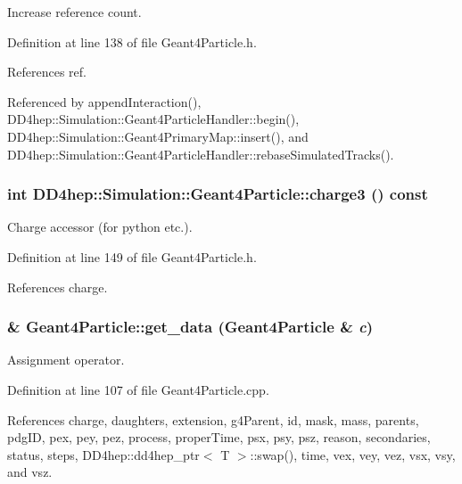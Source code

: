 Increase reference count. 

Definition at line 138 of file Geant4Particle.h.

References ref.

Referenced by appendInteraction(), DD4hep::Simulation::Geant4ParticleHandler::begin(), DD4hep::Simulation::Geant4PrimaryMap::insert(), and DD4hep::Simulation::Geant4ParticleHandler::rebaseSimulatedTracks().\hypertarget{class_d_d4hep_1_1_simulation_1_1_geant4_particle_a4ae9c77141a25cf956f54ace66238bbc}{
\subsubsection[{charge3}]{\setlength{\rightskip}{0pt plus 5cm}int DD4hep::Simulation::Geant4Particle::charge3 () const}}
\label{class_d_d4hep_1_1_simulation_1_1_geant4_particle_a4ae9c77141a25cf956f54ace66238bbc}


Charge accessor (for python etc.). 

Definition at line 149 of file Geant4Particle.h.

References charge.\hypertarget{class_d_d4hep_1_1_simulation_1_1_geant4_particle_ac1991c4a882d0c4515baebb329215516}{
\subsubsection[{get\_\-data}]{ \& Geant4Particle::get\_\-data ({\bf Geant4Particle} \& {\em c})}}
\label{class_d_d4hep_1_1_simulation_1_1_geant4_particle_ac1991c4a882d0c4515baebb329215516}


Assignment operator. 

Definition at line 107 of file Geant4Particle.cpp.

References charge, daughters, extension, g4Parent, id, mask, mass, parents, pdgID, pex, pey, pez, process, properTime, psx, psy, psz, reason, secondaries, status, steps, DD4hep::dd4hep\_\-ptr$<$ T $>$::swap(), time, vex, vey, vez, vsx, vsy, and vsz.

